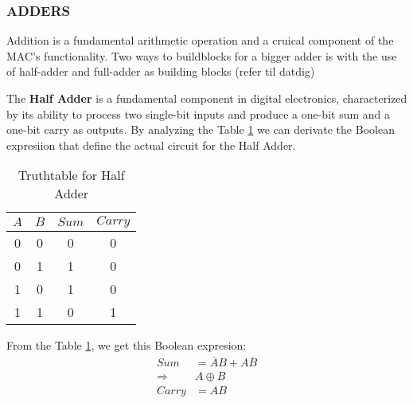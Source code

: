 
\subsubsection{ADDERS}
Addition is a fundamental arithmetic operation and a cruical component of the MAC's functionality. Two ways to buildblocks for a bigger adder is with the use of half-adder and full-adder as building blocks (refer til datdig)


The \textbf{Half Adder} is a fundamental component in digital electronics, characterized by its ability to process two single-bit inputs and produce a one-bit sum and a one-bit carry as outputs. By analyzing the Table \ref{Truthtable for Half Adder} we can derivate the Boolean expresiion that define the actual circuit for the Half Adder.


\begin{table}[H]
    \centering
    \begin{tabular}{|c|c|c|c|}
        \hline
        \(A\) & \(B\) & \(Sum\) & \(Carry\) \\
        \hline
        0 & 0 & 0 & 0 \\
        0 & 1 & 1 & 0 \\
        1 & 0 & 1 & 0 \\
        1 & 1 & 0 & 1 \\
        \hline
        
    \end{tabular}
    \caption{Truthtable for Half Adder}\label{Truthtable for Half Adder}                 
\end{table}

From the Table \ref{Truthtable for Half Adder},  we get this Boolean expresion:
\begin{equation}
    \begin{aligned}
        Sum&=\overline{A}B+A\overline{B}\\
        \Rightarrow&A\oplus B\\
        Carry&=AB\\ 
    \end{aligned}
\end{equation}




